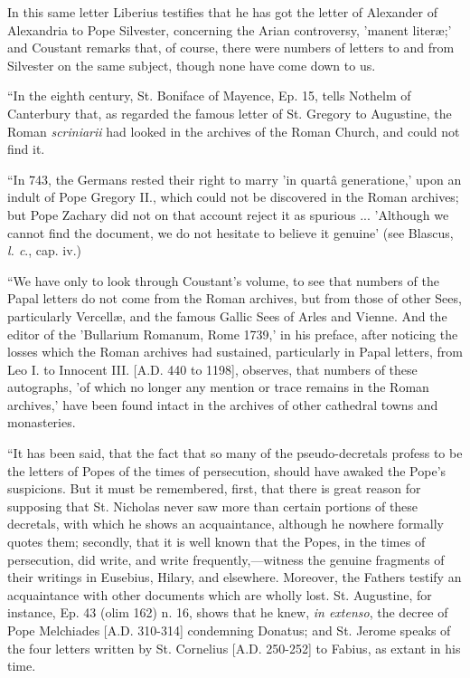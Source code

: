 In this same letter Liberius testifies that he
has got the letter of Alexander of Alexandria to Pope Silvester,
concerning the Arian controversy, 'manent literæ;' and Coustant
remarks that, of course, there were numbers of letters to and from
Silvester on the same subject, though none have come down to us.

``In the eighth century, St. Boniface of Mayence,
Ep. 15, tells Nothelm of Canterbury that, as regarded the famous
letter of St. Gregory to Augustine, the Roman \emph{scriniarii} had
looked in the archives of the Roman Church, and could not find it.

``In 743, the Germans rested their right to marry
'in quartâ generatione,' upon an indult of Pope Gregory II., which
could not be discovered in the Roman archives; but Pope Zachary did
not on that account reject it as spurious ... 'Although we cannot find
the document, we do not hesitate to believe it genuine' (see Blascus, \emph{l.
c}., cap. iv.)

``We have only to look through Coustant's volume,
to see that numbers of the Papal letters do not come from the Roman
archives, but from those of other Sees, particularly Vercellæ, and
the famous Gallic Sees of Arles and Vienne. And the editor of the 'Bullarium
Romanum, Rome 1739,' in his preface, after noticing the losses which
the Roman archives had sustained, particularly in Papal letters, from
Leo I. to Innocent III. [A.D.
440 to 1198], observes, that numbers of these autographs, 'of which no
longer any mention or trace remains in the Roman archives,' have been
found intact in the archives of other cathedral towns and monasteries.

``It has been said, that the fact that so many of
the pseudo-decretals profess to be the letters of Popes of the times of persecution, should have awaked the Pope's suspicions. But it
must be remembered, first, that there is great reason for supposing
that St. Nicholas never saw more than certain portions of these
decretals, with which he shows an acquaintance, although he nowhere
formally quotes them; secondly, that it is well known that the Popes,
in the times of persecution, did write, and write
frequently,—witness the genuine fragments of their writings in
Eusebius, Hilary, and elsewhere. Moreover, the Fathers testify an
acquaintance with other documents which are wholly lost. St.
Augustine, for instance, Ep. 43 (olim 162) n. 16, shows that he knew, \emph{in
extenso}, the decree of Pope Melchiades [A.D.
310-314] condemning Donatus; and St. Jerome speaks of the four letters
written by St. Cornelius [A.D.
250-252] to Fabius, as extant in his time.

